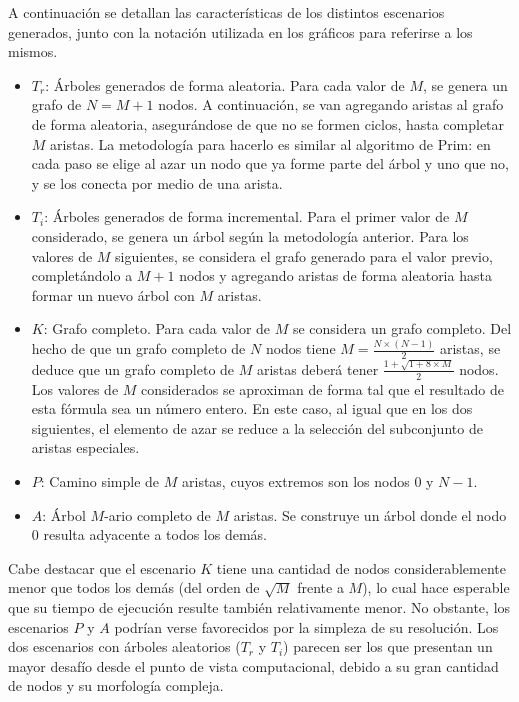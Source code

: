     A continuación se detallan las características de los distintos escenarios
    generados, junto con la notación utilizada en los gráficos para referirse
    a los mismos.
    \begin{itemize}
        \item $T_r$: Árboles generados de forma aleatoria. Para cada valor de
        $M$, se genera un grafo de $N = M+1$ nodos. A continuación, se van
        agregando aristas al grafo de forma aleatoria, asegurándose de que no
        se formen ciclos, hasta completar $M$ aristas. La metodología para
        hacerlo es similar al algoritmo de Prim: en cada paso se elige al azar
        un nodo que ya forme parte del árbol y uno que no, y se los conecta
        por medio de una arista.
        \item $T_i$: Árboles generados de forma incremental. Para el primer
        valor de $M$ considerado, se genera un árbol según la metodología
        anterior. Para los valores de $M$ siguientes, se considera el grafo
        generado para el valor previo, completándolo a $M+1$ nodos y agregando
        aristas de forma aleatoria hasta formar un nuevo árbol con $M$
        aristas.
        \item $K$: Grafo completo. Para cada valor de $M$ se considera un
        grafo completo. Del hecho de que un grafo completo de $N$ nodos tiene
        $M = \frac{N \times (N - 1)}{2}$ aristas, se deduce que un grafo
        completo de $M$ aristas deberá tener $\frac{1 + \sqrt{1 + 8 \times
        M}}{2}$ nodos. Los valores de $M$ considerados se aproximan de forma
        tal que el resultado de esta fórmula sea un número entero. En este
        caso, al igual que en los dos siguientes, el elemento de azar se
        reduce a la selección del subconjunto de aristas especiales.
        \item $P$: Camino simple de $M$ aristas, cuyos extremos son los nodos
        $0$ y $N-1$.
        \item $A$: Árbol $M$-ario completo de $M$ aristas. Se construye un
        árbol donde el nodo $0$ resulta adyacente a todos los demás.
    \end{itemize}

    Cabe destacar que el escenario $K$ tiene una cantidad de nodos
    considerablemente menor que todos los demás (del orden de $\sqrt{M}$
    frente a $M$), lo cual hace esperable que su tiempo de ejecución resulte
    también relativamente menor. No obstante, los escenarios $P$ y $A$
    podrían verse favorecidos por la simpleza de su resolución. Los dos
    escenarios con árboles aleatorios ($T_r$ y $T_i$) parecen ser los que
    presentan un mayor desafío desde el punto de vista computacional, debido a
    su gran cantidad de nodos y su morfología compleja.

